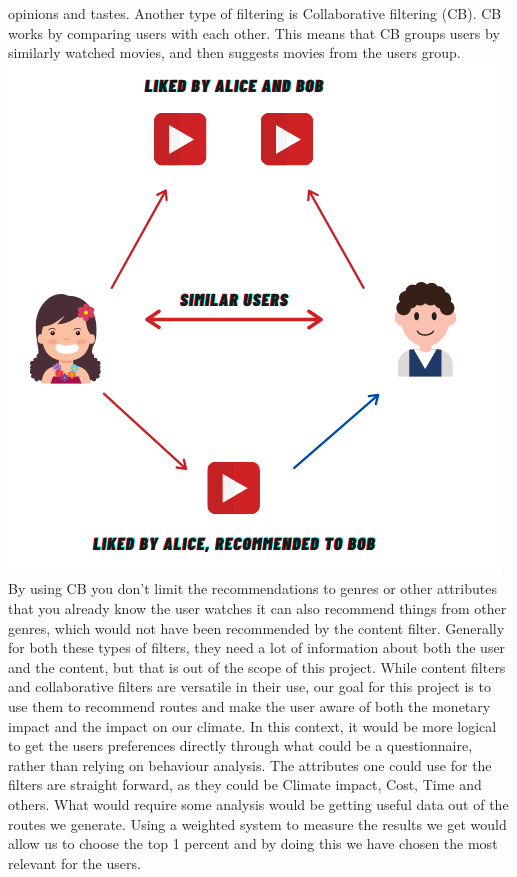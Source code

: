 opinions and tastes. \vspace{5mm}
Another type of filtering is Collaborative filtering (CB).
CB works by comparing users with each other.
This means that CB groups users by similarly watched movies, and then suggests movies from the users group.\newline
\includegraphics[]{images/collaborative-filtering} \newline
By using CB you don't limit the recommendations to genres or other attributes that you already know the user watches it
can also recommend things from other genres, which would not have been recommended by the content filter.\newline
Generally for both these types of filters, they need a lot of information about both the user and the content, but that
is out of the scope of this project.\newline
\vspace{5mm}
While content filters and collaborative filters are versatile in their use, our goal for this project is to use them to
recommend routes and make the user aware of both the monetary impact and the impact on our climate.
In this context, it would be more logical to get the users preferences directly through what could be a questionnaire,
rather than relying on behaviour analysis.
The attributes one could use for the filters are straight forward, as they could be Climate impact, Cost, Time and
others.
What would require some analysis would be getting useful data out of the routes we generate.
Using a weighted system to measure the results we get would allow us to choose the top 1 percent
and by doing this we have chosen the most relevant for the users.\newline
